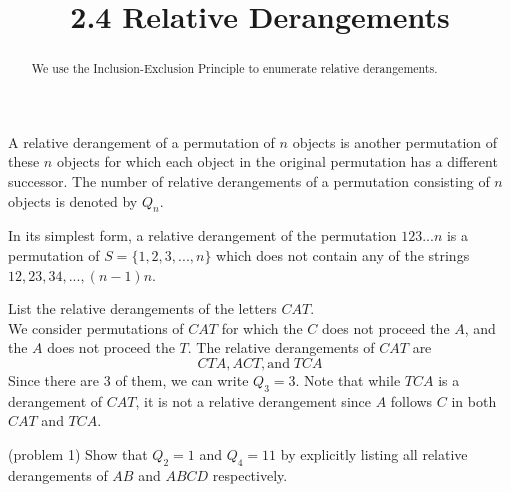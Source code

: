 \documentclass[handout]{ximera}
\title{2.4 Relative Derangements}
\begin{document}
\begin{abstract}
We use the Inclusion-Exclusion Principle to enumerate relative derangements.
\end{abstract}

\maketitle



\begin{definition}
A relative derangement of a permutation of $n$ objects is another permutation of these $n$ objects for which each object in the original 
permutation has a different successor. The number of relative derangements of a permutation consisting 
of $n$ objects is denoted by $Q_n$.
\end{definition}

\begin{remark}
In its simplest form, a relative derangement of the permutation $123...n$ is a permutation of $S = \{1, 2, 3, ..., n\}$ which does not contain any of the strings $12, 23, 34, ..., (n-1)n$.
\end{remark}

\begin{example}
List the relative derangements of the letters $CAT$.\\
  We consider permutations of $CAT$ for which the $C$ does not proceed 
the $A$, and the $A$ does not proceed the $T$. The relative derangements of $CAT$ are
\[
CTA, ACT, \text{and} \;TCA
\]
Since there are 3 of them, we can write $Q_3 = 3$.
Note that while $TCA$ is a derangement of $CAT$, it is not a relative derangement 
since $A$ follows $C$ in both $CAT$ and $TCA$.
\end{example}

\begin{problem}(problem 1)
Show that $Q_2 = 1$ and $Q_4 = 11$ by explicitly listing all relative derangements of $AB$ and $ABCD$ respectively.
\end{problem}
\end{document}
